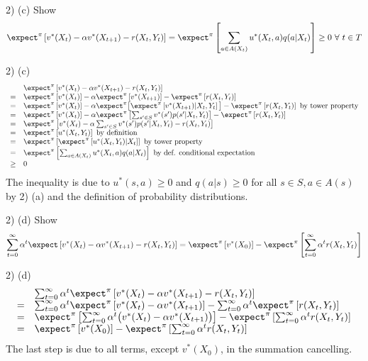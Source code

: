 \documentclass[11pt,a4paper]{article}
\begin{document}
\begin{question}{2) (c)}
  Show
  \[ \expect^\pi\left[v^*(X_t)-\alpha v^*(X_{t+1})-r(X_t,Y_t)\right]=\expect^\pi\left[\sum_{a\in A(X_t)}u^*(X_t,a)q(a|X_t)\right]\geq0\ \forall\ t\in T \]
\end{question}

\begin{answer}{2) (c)}
  \[\begin{array}{rl}
    &\expect^\pi\left[v^*(X_t)-\alpha v^*(X_{t+1})-r(X_t,Y_t)\right]\\
    =&\expect^\pi\left[v^*(X_t)\right]-\alpha\expect^\pi\left[v^*(X_{t+1})\right]-\expect^\pi\left[r(X_t,Y_t)\right]\\
    =&\expect^\pi\left[v^*(X_t)\right]-\alpha\expect^\pi\big[\expect^\pi\left[v^*(X_{t+1})|X_t,Y_t\right]\big]-\expect^\pi\left[r(X_t,Y_t)\right]\text{ by tower property}\\
    =&\expect^\pi\left[v^*(X_t)\right]-\alpha\expect^\pi\left[\sum_{s'\in S}v^*(s')p(s'|X_t,Y_t)\right]-\expect^\pi\left[r(X_t,Y_t)\right]\\
    =&\expect^\pi\left[v^*(X_t)-\alpha\sum_{s'\in S}v^*(s')p(s'|X_t,Y_t)-r(X_t,Y_t)\right]\\
    =&\expect^\pi\left[u^*(X_t,Y_t)\right]\text{ by definition}\\
    =&\expect^\pi\left[\expect^\pi\left[u^*(X_t,Y_t)|X_t\right]\right]\text{ by tower property}\\
    =&\expect^\pi\left[\sum_{a\in A(X_t)}u^*(X_t,a)q(a|X_t)\right]\text{ by def. conditional expectation}\\
    \geq&0
  \end{array}\]
  The inequality is due to $u^*(s,a)\geq0$ and $q(a|s)\geq0$ for all $s\in S,a\in A(s)$ by 2) (a) and the definition of probability distributions.
\end{answer}

\begin{question}{2) (d)}
  Show
  \[ \sum_{t=0}^\infty\alpha^t\expect\left[v^*(X_t)-\alpha v^*(X_{t+1})-r(X_t,Y_t)\right]=\expect^\pi\left[v^*(X_0)\right]-\expect^\pi\left[\sum_{t=0}^\infty\alpha^tr(X_t,Y_t)\right] \]
\end{question}

\begin{answer}{2) (d)}
  \[\begin{array}{rl}
    &\sum_{t=0}^\infty\alpha^t\expect^\pi\left[v^*(X_t)-\alpha v^*(X_{t+1})-r(X_t,Y_t)\right]\\
    =&\sum_{t=0}^\infty\alpha^t\expect^\pi\left[v^*(X_t)-\alpha v^*(X_{t+1})\right]-\sum_{t=0}^\infty\alpha^t\expect^\pi\left[r(X_t,Y_t)\right]\\
    =&\expect^\pi\left[\sum_{t=0}^\infty\alpha^t\big(v^*(X_t)-\alpha v^*(X_{t+1})\big)\right]-\expect^\pi\left[\sum_{t=0}^\infty\alpha^tr(X_t,Y_t)\right]\\
    =&\expect^\pi\left[v^*(X_0)\right]-\expect^\pi\left[\sum_{t=0}^\infty\alpha^tr(X_t,Y_t)\right]
  \end{array}\]
  The last step is due to all terms, except $v^*(X_0)$, in the summation cancelling.
\end{answer}
\end{document}
